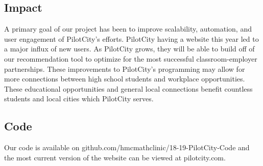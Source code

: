 \subsection{Impact}

	A primary goal of our project has been to improve scalability, automation, and user engagement of PilotCity's efforts. 
	PilotCity having a website this year led to a major influx of new users. As PilotCity grows, they will be able to build off of our recommendation tool to optimize for the most successful classroom-employer partnerships. These improvements to PilotCity's programming may allow for more connections between high school students and workplace opportunities. These educational opportunities and general local connections benefit countless students and local cities which PilotCity serves. 

\subsection{Code}
    Our code is available on github.com/hmcmathclinic/18-19-PilotCity-Code and the most current version of the website can be viewed at pilotcity.com. 
